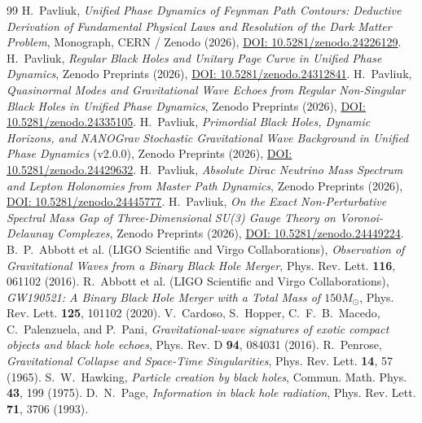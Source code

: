 \documentclass[11pt,a4paper]{article}
\begin{document}
\begin{thebibliography}{99}
 H.~Pavliuk, \textit{Unified Phase Dynamics of Feynman Path Contours: Deductive Derivation of Fundamental Physical Laws and Resolution of the Dark Matter Problem}, Monograph, CERN / Zenodo (2026), \href{https://doi.org/10.5281/zenodo.24226129}{DOI: 10.5281/zenodo.24226129}.
 H.~Pavliuk, \textit{Regular Black Holes and Unitary Page Curve in Unified Phase Dynamics}, Zenodo Preprints (2026), \href{https://doi.org/10.5281/zenodo.24312841}{DOI: 10.5281/zenodo.24312841}.
 H.~Pavliuk, \textit{Quasinormal Modes and Gravitational Wave Echoes from Regular Non-Singular Black Holes in Unified Phase Dynamics}, Zenodo Preprints (2026), \href{https://doi.org/10.5281/zenodo.24335105}{DOI: 10.5281/zenodo.24335105}.
 H.~Pavliuk, \textit{Primordial Black Holes, Dynamic Horizons, and NANOGrav Stochastic Gravitational Wave Background in Unified Phase Dynamics} (v2.0.0), Zenodo Preprints (2026), \href{https://doi.org/10.5281/zenodo.24429632}{DOI: 10.5281/zenodo.24429632}.
 H.~Pavliuk, \textit{Absolute Dirac Neutrino Mass Spectrum and Lepton Holonomies from Master Path Dynamics}, Zenodo Preprints (2026), \href{https://doi.org/10.5281/zenodo.24445777}{DOI: 10.5281/zenodo.24445777}.
 H.~Pavliuk, \textit{On the Exact Non-Perturbative Spectral Mass Gap of Three-Dimensional SU(3) Gauge Theory on Voronoi-Delaunay Complexes}, Zenodo Preprints (2026), \href{https://doi.org/10.5281/zenodo.24449224}{DOI: 10.5281/zenodo.24449224}.
 B.~P.~Abbott et al. (LIGO Scientific and Virgo Collaborations), \textit{Observation of Gravitational Waves from a Binary Black Hole Merger}, Phys. Rev. Lett. \textbf{116}, 061102 (2016).
 R.~Abbott et al. (LIGO Scientific and Virgo Collaborations), \textit{GW190521: A Binary Black Hole Merger with a Total Mass of $150 M_\odot$}, Phys. Rev. Lett. \textbf{125}, 101102 (2020).
 V.~Cardoso, S.~Hopper, C.~F.~B.~Macedo, C.~Palenzuela, and P.~Pani, \textit{Gravitational-wave signatures of exotic compact objects and black hole echoes}, Phys. Rev. D \textbf{94}, 084031 (2016).
 R.~Penrose, \textit{Gravitational Collapse and Space-Time Singularities}, Phys. Rev. Lett. \textbf{14}, 57 (1965).
 S.~W.~Hawking, \textit{Particle creation by black holes}, Commun. Math. Phys. \textbf{43}, 199 (1975).
 D.~N.~Page, \textit{Information in black hole radiation}, Phys. Rev. Lett. \textbf{71}, 3706 (1993).
\end{thebibliography}
\end{document}
